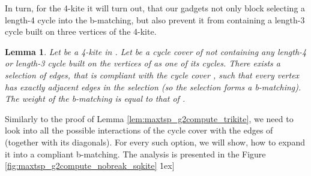 \documentclass[a4, 11pt]{article}
\newcommand{\dowod}{\noindent{\bf Proof.~}}
\newcommand{\koniec}{\hfill \.1ex]}
\newcommand{\<}{\langle}
\renewcommand{\>}{\rangle}
\newtheorem{lemma}{Lemma}
\begin{document}
  In turn, for the 4-kite it will turn out, that our gadgets not only block
  selecting a length-4 cycle into the b-matching, but also prevent it from
  containing a length-3 cycle built on three vertices of the 4-kite.
  \begin{lemma}
    \label{lem:maxtsp_g2compute_nobreak_sqkite}
    Let  be a 4-kite in . Let  be a cycle cover of  not containing any length-4 or length-3 cycle built on the vertices of  as one of its cycles. There exists a selection of edges, that is compliant with the cycle cover , such that every vertex  has exactly  adjacent edges in the selection (so the selection forms a b-matching). The weight of the b-matching is equal to that of .
  \end{lemma}
  \dowod
    Similarly to the proof of Lemma \ref{lem:maxtsp_g2compute_trikite}, we
    need to look into all the possible interactions of the cycle cover
     with the edges of  (together with its diagonals). For every
    such option, we will show, how to expand it into a compliant b-matching. The
    analysis is presented in the
    Figure \ref{fig:maxtsp_g2compute_nobreak_sqkite}
  \koniec
\end{document}

